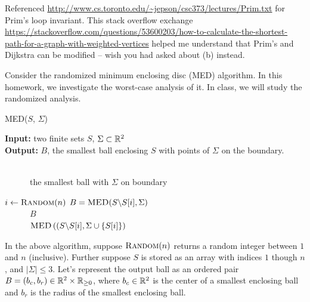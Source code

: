 \documentclass{article}
\begin{document}
Referenced \url{http://www.cs.toronto.edu/~jepson/csc373/lectures/Prim.txt} for Prim's loop invariant. This stack overflow exchange \url{https://stackoverflow.com/questions/53600203/how-to-calculate-the-shortest-path-for-a-graph-with-weighted-vertices} helped me understand that Prim's and Dijkstra can be modified -- wish you had asked about (b) instead.

Consider the randomized minimum enclosing disc (MED) algorithm.  In this
homework, we investigate the worst-case analysis of it.  In class, we will study
the randomized analysis.

\begin{algorithm}\caption{\textsc{MED($S$, $\Sigma$)}}\label{alg:seb}
    {\bf Input:} two finite sets $S$, $\Sigma \subset {\mathbb R}^2$\\
    {\bf Output:} $B$, the smallest ball enclosing $S$ with points of
    $\Sigma$ on the boundary.

    \begin{algorithmic}[1]
        \\
        ~~~~~~\Return the smallest ball with $\Sigma$ on boundary
        \EndIf

        \State $i \gets \textsc{Random}(n)$
        \State $B = \textsc{MED}(S \backslash S[i], \Sigma)$
        \\
        ~~~~~~\Return $B$
        \Else\\
        ~~~~~~\Return $\textsc{MED}\left((S \backslash S[i], \Sigma \cup \{ S[i]
        \}\right)$
        \EndIf
    \end{algorithmic}
\end{algorithm}

In the above algorithm, suppose $\textsc{Random}(n)$ returns a random integer
between $1$ and $n$ (inclusive).  Further suppose
$S$ is stored as an array with indices $1$ though $n$,
and $|\Sigma| \leq 3$.  Let's represent the output ball as an ordered
pair~$B=(b_c,b_r) \in {\mathbb R}^2 \times {\mathbb R}_{\geq 0}$,
where $b_c\in {\mathbb R}^2$ is the center of a smallest enclosing ball and $b_r$ is the
radius of the smallest enclosing ball.
\end{document}
